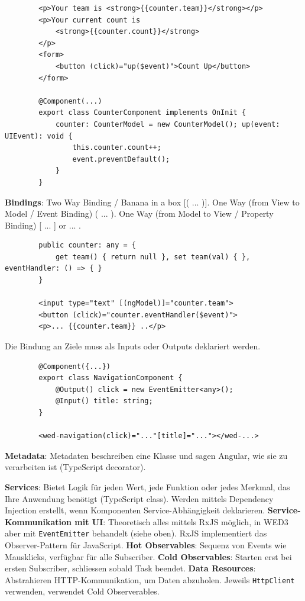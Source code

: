\documentclass[10pt,landscape]{article}
\begin{document}
\begin{multicols}{3}
        \begin{lstlisting}
        <p>Your team is <strong>{{counter.team}}</strong></p>
        <p>Your current count is
            <strong>{{counter.count}}</strong>
        </p>
        <form>
            <button (click)="up($event)">Count Up</button>
        </form>

        @Component(...)
        export class CounterComponent implements OnInit {
            counter: CounterModel = new CounterModel(); up(event: UIEvent): void {
                this.counter.count++;
                event.preventDefault();
            }
        }
        \end{lstlisting}

        \textbf{Bindings}: Two Way Binding / Banana in a box [( ... )].
        One Way (from View to Model / Event Binding) ( ... ).
        One Way (from Model to View / Property Binding) [ ... ] or {{ ... }}.

        \begin{lstlisting}
        public counter: any = {
            get team() { return null }, set team(val) { }, eventHandler: () => { }
        }

        <input type="text" [(ngModel)]="counter.team">
        <button (click)="counter.eventHandler($event)">
        <p>... {{counter.team}} ..</p>
        \end{lstlisting}

        Die Bindung an Ziele muss als Inputs oder Outputs deklariert werden.

        \begin{lstlisting}
        @Component({...})
        export class NavigationComponent {
            @Output() click = new EventEmitter<any>();
            @Input() title: string;
        }

        <wed-navigation(click)="..."[title]="..."></wed-...>
        \end{lstlisting}

        \textbf{Metadata}: Metadaten beschreiben eine Klasse und sagen Angular, wie sie zu verarbeiten ist (TypeScript decorator).

        \textbf{Services}: Bietet Logik für jeden Wert, jede Funktion oder jedes Merkmal, das Ihre Anwendung benötigt (TypeScript class).
        Werden mittels Dependency Injection erstellt, wenn Komponenten Service-Abhängigkeit deklarieren.
        \textbf{Service-Kommunikation mit UI}: Theoretisch alles mittels RxJS möglich, in WED3 aber mit \lstinline{EventEmitter} behandelt (siehe oben).
        RxJS implementiert das Observer-Pattern für JavaScript.
        \textbf{Hot Observables}: Sequenz von Events wie Mausklicks, verfügbar für alle Subscriber.
        \textbf{Cold Observables}: Starten erst bei ersten Subscriber, schliessen sobald Task beendet.
        \textbf{Data Resources}: Abstrahieren HTTP-Kommunikation, um Daten abzuholen.
        Jeweils \lstinline{HttpClient} verwenden, verwendet Cold Observerables.


\end{multicols}
\end{document}
